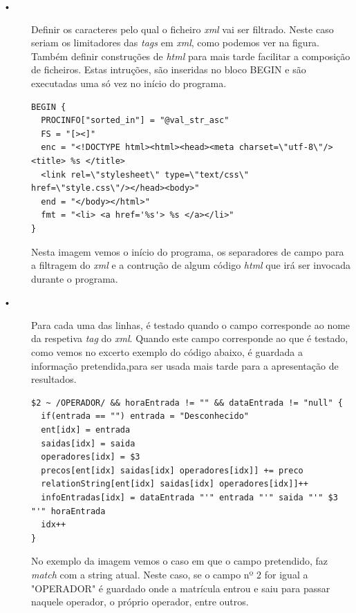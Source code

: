 \documentclass{report}
\begin{document}
\begin{description}

\item[•] Definir os caracteres pelo qual o ficheiro \textit{xml} vai ser filtrado. Neste caso seriam os limitadores das \textit{tags} em \textit{xml}, como podemos ver na figura. Também definir construções de \textit{html} para mais tarde facilitar a composição de ficheiros. Estas intruções, são inseridas no bloco BEGIN e são executadas uma só vez no início do programa.\\

\begin{verbatim}
BEGIN {
  PROCINFO["sorted_in"] = "@val_str_asc"
  FS = "[><]"
  enc = "<!DOCTYPE html><html><head><meta charset=\"utf-8\"/><title> %s </title>
  <link rel=\"stylesheet\" type=\"text/css\" href=\"style.css\"/></head><body>"
  end = "</body></html>"
  fmt = "<li> <a href='%s'> %s </a></li>"
}
\end{verbatim}

Nesta imagem vemos o início do programa, os separadores de campo para a filtragem do \textit{xml} e a contrução de algum código \textit{html} que irá ser invocada durante o programa.\\


\item[•] Para cada uma das linhas, é testado quando o campo  corresponde ao nome da respetiva \textit{tag} do \textit{xml}. Quando este campo corresponde ao que é testado, como vemos no excerto exemplo do código abaixo, é guardada a informação pretendida,para ser usada mais tarde para a apresentação de resultados. \\

\begin{verbatim}
$2 ~ /OPERADOR/ && horaEntrada != "" && dataEntrada != "null" {
  if(entrada == "") entrada = "Desconhecido"
  ent[idx] = entrada
  saidas[idx] = saida
  operadores[idx] = $3
  precos[ent[idx] saidas[idx] operadores[idx]] += preco
  relationString[ent[idx] saidas[idx] operadores[idx]]++
  infoEntradas[idx] = dataEntrada "'" entrada "'" saida "'" $3 "'" horaEntrada
  idx++
}
\end{verbatim}

No exemplo da imagem vemos o caso em que o campo pretendido, faz \textit{match} com a string atual. Neste caso, se o campo nº 2 for igual a "OPERADOR" é guardado onde a matrícula entrou e saiu para passar naquele operador, o próprio operador, entre outros.\\





\end{description}
\end{document}
